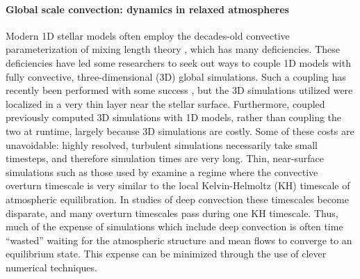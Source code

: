 \documentclass[aps, pre, onecolumn, nofootinbib, notitlepage, groupedaddress, amsfonts, amssymb, amsmath]{revtex4-1}
\begin{document}
\paragraph*{Global scale convection: dynamics in relaxed atmospheres}
Modern 1D stellar models often employ the decades-old convective parameterization of mixing length theory \citep{bohm-vitense1958}, which has many deficiencies.
These deficiencies have led some researchers to seek out ways to couple 1D models with fully convective, three-dimensional (3D) global simulations.
Such a coupling has recently been performed with some success \citep{jorgensen&weiss2019}, but the 3D simulations utilized were localized in a very thin layer near the stellar surface.
Furthermore, \citet{jorgensen&weiss2019} coupled previously computed 3D simulations with 1D models, rather than coupling the two at runtime, largely because 3D simulations are costly.
Some of these costs are unavoidable: highly resolved, turbulent simulations necessarily take small timesteps, and therefore simulation times are very long.
Thin, near-surface simulations such as those used by \citet{jorgensen&weiss2019} examine a regime where the convective overturn timescale is very similar to the local Kelvin-Helmoltz (KH) timescale of atmospheric equilibration.
In studies of deep convection these timescales become disparate, and many overturn timescales pass during one KH timescale.
Thus, much of the expense of simulations which include deep convection is often time ``wasted'' waiting for the atmospheric structure and mean flows to converge to an equilibrium state.
This expense can be minimized through the use of clever numerical techniques.
\end{document}
